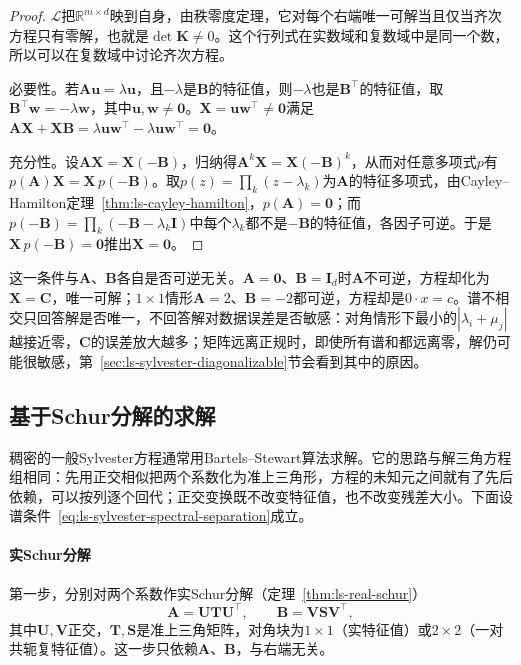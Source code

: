 \begin{proof}
$\mathcal L$把$\mathbb R^{m\times d}$映到自身，由秩零度定理，它对每个右端唯一可解当且仅当齐次方程只有零解，也就是$\det\bm K\neq0$。这个行列式在实数域和复数域中是同一个数，所以可以在复数域中讨论齐次方程。

必要性。若$\bm A\bm u=\lambda\bm u$，且$-\lambda$是$\bm B$的特征值，则$-\lambda$也是$\bm B^\top$的特征值，取$\bm B^\top\bm w=-\lambda\bm w$，其中$\bm u,\bm w\neq\bm0$。$\bm X=\bm u\bm w^\top\neq\bm0$满足$\bm A\bm X+\bm X\bm B=\lambda\bm u\bm w^\top-\lambda\bm u\bm w^\top=\bm0$。

充分性。设$\bm A\bm X=\bm X(-\bm B)$，归纳得$\bm A^k\bm X=\bm X(-\bm B)^k$，从而对任意多项式$p$有$p(\bm A)\bm X=\bm X\,p(-\bm B)$。取$p(z)=\prod_k(z-\lambda_k)$为$\bm A$的特征多项式，由Cayley--Hamilton定理~\ref{thm:ls-cayley-hamilton}，$p(\bm A)=\bm0$；而$p(-\bm B)=\prod_k(-\bm B-\lambda_k\bm I)$中每个$\lambda_k$都不是$-\bm B$的特征值，各因子可逆。于是$\bm X\,p(-\bm B)=\bm0$推出$\bm X=\bm0$。
\end{proof}

这一条件与$\bm A$、$\bm B$各自是否可逆无关。$\bm A=\bm0$、$\bm B=\bm I_d$时$\bm A$不可逆，方程却化为$\bm X=\bm C$，唯一可解；$1\times1$情形$\bm A=2$、$\bm B=-2$都可逆，方程却是$0\cdot x=c$。谱不相交只回答解是否唯一，不回答解对数据误差是否敏感：对角情形下最小的$|\lambda_i+\mu_j|$越接近零，$\bm C$的误差放大越多；矩阵远离正规时，即使所有谱和都远离零，解仍可能很敏感，第~\ref{sec:ls-sylvester-diagonalizable}节会看到其中的原因。

\subsection{基于Schur分解的求解}
\label{sec:ls-sylvester-schur}

稠密的一般Sylvester方程通常用Bartels--Stewart算法求解。它的思路与解三角方程组相同：先用正交相似把两个系数化为准上三角形，方程的未知元之间就有了先后依赖，可以按列逐个回代；正交变换既不改变特征值，也不改变残差大小。下面设谱条件~\eqref{eq:ls-sylvester-spectral-separation}成立。

\paragraph{实Schur分解}
第一步，分别对两个系数作实Schur分解（定理~\ref{thm:ls-real-schur}）
\[
 \bm A=\bm U\bm T\bm U^\top,\qquad \bm B=\bm V\bm S\bm V^\top,
\]
其中$\bm U,\bm V$正交，$\bm T,\bm S$是准上三角矩阵，对角块为$1\times1$（实特征值）或$2\times2$（一对共轭复特征值）。这一步只依赖$\bm A$、$\bm B$，与右端无关。

